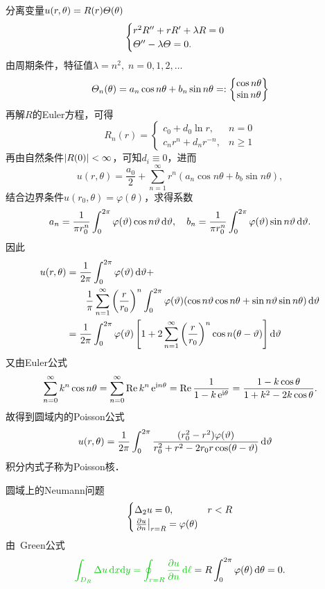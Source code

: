分离变量$u(r,\theta)=R(r)\varTheta(\theta)$
\begin{align*}
	\begin{cases}
		r^2R''+rR'+\lambda R=0\\
		\varTheta''-\lambda\varTheta=0.
	\end{cases}
\end{align*}
由周期条件，特征值$\lambda=n^2,\;n=0,1,2,\ldots$
\[\varTheta_n(\theta)=a_n\cos n\theta+b_n\sin n\theta=:\begin{Bmatrix}
	\cos n\theta\\
	\sin n\theta
\end{Bmatrix}\]
再解$R$的Euler方程，可得
\[R_n(r)=\begin{cases}
	c_0+d_0\ln r,&n=0\\
	c_nr^n+d_nr^{-n},&n\geqslant 1
\end{cases}\]
再由自然条件$\left\lvert R(0)\right\rvert<\infty$，可知$d_i\equiv 0$，进而
\[u(r,\theta)=\frac{a_0}2+\sum_{n=1}^\infty r^n(a_n\cos n\theta+b_b\sin n\theta),\]
结合边界条件$u(r_0,\theta)=\varphi(\theta)$，求得系数
\[a_n=\frac1{\pi r_0^n}\int_0^{2\pi}\varphi(\vartheta)\cos n\vartheta\mathop{}\!\mathrm{d}\vartheta,\quad b_n=\frac1{\pi r_0^n}\int_0^{2\pi}\varphi(\vartheta)\sin n\vartheta\mathop{}\!\mathrm{d}\vartheta.\]
因此
\begin{align*}
	u(r,\theta)&=\frac1{2\pi}\int_0^{2\pi}\varphi(\vartheta)\mathop{}\!\mathrm{d}\vartheta+\\
	&\qquad\frac1\pi\sum_{n=1}^\infty\left(\frac r{r_0}\right)^n\int_0^{2\pi}\varphi(\vartheta)(\cos n\vartheta\cos n\theta+\sin n\vartheta\sin n\theta)\mathop{}\!\mathrm{d}\vartheta\\
	&=\frac1{2\pi}\int_0^{2\pi}\varphi(\vartheta)\left[1+2\sum_{n=1}^\infty\left(\frac r{r_0}\right)^n\cos n(\theta-\vartheta)\right]\mathop{}\!\mathrm{d}\vartheta
\end{align*}
又由Euler公式
\begin{align*}
\sum_{n=0}^\infty k^n\cos n\theta=\sum_{n=0}^\infty\operatorname{Re} k^n\mathop{}\!\mathrm{e}^{\mathrm{i} n\theta}=\operatorname{Re}\frac1{1-k\mathop{}\!\mathrm{e}^{\mathrm{i}\theta}}=\frac{1-k\cos\theta}{1+k^2-2k\cos\theta}.
\end{align*}
故得到圆域内的Poisson公式
\begin{align}
	u(r,\theta)&=\frac1{2\pi}\int_0^{2\pi}\frac{(r_0^2-r^2)\varphi(\vartheta)}{r_0^2+r^2-2r_0r\cos(\theta-\vartheta)}\mathop{}\!\mathrm{d}\vartheta
\end{align}
积分内式子称为Poisson核．

\eg[3] 圆域上的Neumann问题
\begin{align*}
	\begin{cases}
		\Delta_2u=0,&r<R\\
		\left.\frac{\partial^{\;\!\!}u}{\partial n^{\;\!\!}}\right\rvert_{r=R}=\varphi(\theta)
	\end{cases}
\end{align*}
由~\textcolor[rgb]{0,.8,0}{Green公式}
	\begin{align*}
		{\color[rgb]{0,.8,0}{\int_{D_R}\lap u\d x\nd y=\oint_{r=R}\pv un\d\ell}}=R\int_0^{2\pi}\varphi(\theta)\d\theta=0.
	\end{align*}

